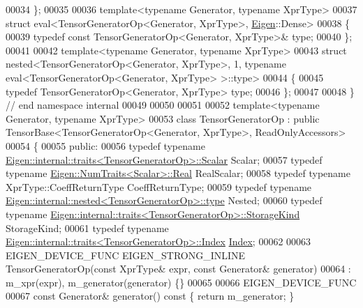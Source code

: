 \begin{DoxyCode}
00034 \};
00035 
00036 \textcolor{keyword}{template}<\textcolor{keyword}{typename} Generator, \textcolor{keyword}{typename} XprType>
00037 \textcolor{keyword}{struct }eval<TensorGeneratorOp<Generator, XprType>, \hyperlink{namespace_eigen}{Eigen}::Dense>
00038 \{
00039   \textcolor{keyword}{typedef} \textcolor{keyword}{const} TensorGeneratorOp<Generator, XprType>& type;
00040 \};
00041 
00042 \textcolor{keyword}{template}<\textcolor{keyword}{typename} Generator, \textcolor{keyword}{typename} XprType>
00043 \textcolor{keyword}{struct }nested<TensorGeneratorOp<Generator, XprType>, 1, typename eval<TensorGeneratorOp<Generator, XprType>
       >::type>
00044 \{
00045   \textcolor{keyword}{typedef} TensorGeneratorOp<Generator, XprType> type;
00046 \};
00047 
00048 \}  \textcolor{comment}{// end namespace internal}
00049 
00050 
00051 
00052 \textcolor{keyword}{template}<\textcolor{keyword}{typename} Generator, \textcolor{keyword}{typename} XprType>
00053 \textcolor{keyword}{class }TensorGeneratorOp : \textcolor{keyword}{public} TensorBase<TensorGeneratorOp<Generator, XprType>, ReadOnlyAccessors>
00054 \{
00055   \textcolor{keyword}{public}:
00056   \textcolor{keyword}{typedef} \textcolor{keyword}{typename} \hyperlink{struct_eigen_1_1internal_1_1traits}{Eigen::internal::traits<TensorGeneratorOp>::Scalar}
       Scalar;
00057   \textcolor{keyword}{typedef} \textcolor{keyword}{typename} \hyperlink{group___sparse_core___module}{Eigen::NumTraits<Scalar>::Real} RealScalar;
00058   \textcolor{keyword}{typedef} \textcolor{keyword}{typename} XprType::CoeffReturnType CoeffReturnType;
00059   \textcolor{keyword}{typedef} \textcolor{keyword}{typename} \hyperlink{class_eigen_1_1internal_1_1_tensor_lazy_evaluator_writable}{Eigen::internal::nested<TensorGeneratorOp>::type}
       Nested;
00060   \textcolor{keyword}{typedef} \textcolor{keyword}{typename} \hyperlink{struct_eigen_1_1internal_1_1traits}{Eigen::internal::traits<TensorGeneratorOp>::StorageKind}
       StorageKind;
00061   \textcolor{keyword}{typedef} \textcolor{keyword}{typename} \hyperlink{struct_eigen_1_1internal_1_1traits}{Eigen::internal::traits<TensorGeneratorOp>::Index}
       \hyperlink{namespace_eigen_a62e77e0933482dafde8fe197d9a2cfde}{Index};
00062 
00063   EIGEN\_DEVICE\_FUNC EIGEN\_STRONG\_INLINE TensorGeneratorOp(\textcolor{keyword}{const} XprType& expr, \textcolor{keyword}{const} Generator& generator)
00064       : m\_xpr(expr), m\_generator(generator) \{\}
00065 
00066     EIGEN\_DEVICE\_FUNC
00067     \textcolor{keyword}{const} Generator& generator()\textcolor{keyword}{ const }\{ \textcolor{keywordflow}{return} m\_generator; \}

\end{DoxyCode}
